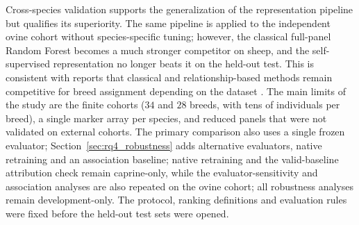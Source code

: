 Cross-species validation supports the generalization of the
representation pipeline but qualifies its superiority. The same
pipeline is applied to the independent ovine cohort without
species-specific tuning;
however, the classical full-panel Random Forest becomes a much
stronger competitor on sheep, and the self-supervised representation
no longer beats it on the held-out test. This is consistent with
reports that classical and relationship-based methods remain
competitive for breed assignment depending on the dataset
\cite{wilmot2023genomic}. The main limits of the study are the
finite cohorts ($34$ and $28$ breeds, with tens of individuals per
breed), a single marker array per species, and reduced panels that were
not validated on external cohorts. The primary comparison also uses a
single frozen evaluator; Section~\ref{sec:rq4_robustness} adds
alternative evaluators, native retraining and an association baseline;
native retraining and the valid-baseline attribution check remain
caprine-only, while the evaluator-sensitivity and association analyses
are also repeated on the ovine cohort; all robustness analyses remain
development-only. The
protocol, ranking definitions and evaluation rules were fixed before
the held-out test sets were opened.
